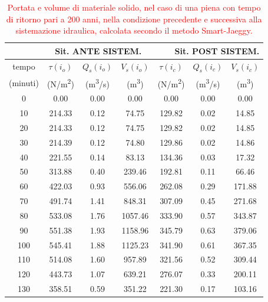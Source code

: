 \begin{table}[H] \centering
    \caption{\textcolor{red}{Portata e volume di materiale solido, nel caso di una piena con tempo di ritorno pari a 200 anni, nella condizione precedente e successiva alla sistemazione idraulica, calcolata secondo il metodo Smart-Jaeggy.}}
    \begin{tabular}{ccccccc}
\toprule
& \multicolumn{3}{c}{Sit. ANTE SISTEM.} & \multicolumn{3}{r}{Sit. POST SISTEM.} \\
\midrule
    tempo & $\tau(i_o)$ & $Q_s(i_o)$ & $V_s(i_o)$ & $\tau(i_c)$ & $Q_s(i_c)$ & $V_s(i_c)$ \\
    (minuti) & (\unit{N/m^2}) & (\unit{m^3/s}) & (\unit{m^3}) & (\unit{N/m^2}) & (\unit{m^3/s}) & (\unit{m^3}) \\
\midrule
    0 & 0.00 & 0.00   & 0.00 & 0.00     & 0.00   & 0.00   \\
    10 & 214.33 & 0.12   & 74.75 & 129.82      & 0.02   & 14.85  \\
    20 & 214.33 & 0.12   & 74.75   & 129.82 & 0.02   & 14.85  \\
    30       & 214.39 & 0.12   & 74.80   & 129.86 & 0.02   & 14.86  \\
    40       & 221.55  & 0.14   & 83.13   & 134.36 & 0.03   & 17.32  \\
    50       & 313.88                       & 0.40   & 239.46  & 192.81                       & 0.11   & 66.46  \\
    60       & 422.03                       & 0.93   & 556.06  & 262.08                       & 0.29   & 171.88 \\
    70       & 491.74                       & 1.41   & 848.31  & 307.09                       & 0.45   & 271.68 \\
    80       & 533.08                       & 1.76   & 1057.46 & 333.90                       & 0.57   & 343.87 \\
    90       & 551.38                       & 1.93   & 1158.96 & 345.79                       & 0.63   & 379.06 \\
    100      & 545.41                       & 1.88   & 1125.23 & 341.90                       & 0.61   & 367.35 \\
    110      & 514.08                       & 1.60   & 957.89  & 321.56                       & 0.52   & 309.44 \\
    120      & 443.73                       & 1.07   & 639.21  & 276.07                       & 0.33   & 200.11 \\
    130      & 358.51                       & 0.59   & 351.22  & 221.30                       & 0.17   & 103.16 \\

\end{tabular}
\end{table}

